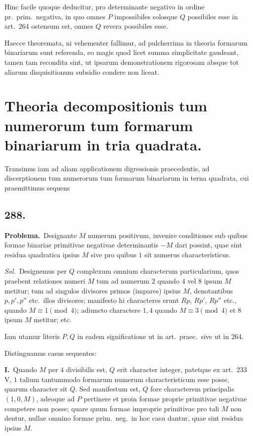 \documentclass[12pt,a4paper]{article}
\theoremstyle{plain}
\theoremstyle{definition}
\theoremstyle{remark}
\begin{document}
Hinc facile quoque deducitur, pro determinante negativo in ordine pr.\ prim.\ negativa, in quo omnes $P$ impossibiles solosque $Q$ possibiles esse in art.\ 264 ostensum est, omnes $Q$ revera possibiles esse.

Haecce theoremata, ni vehementer fallimur, ad pulcherrima in theoria formarum binariarum sunt referenda, eo magis quod licet summa simplicitate gaudeant, tamen tam recondita sint, ut ipsarum demonstrationem rigorosam absque tot aliarum disquisitionum subsidio condere non liceat.

\section*{Theoria decompositionis tum numerorum tum formarum binariarum in tria quadrata.}

Transimus iam ad aliam applicationem digressionis praecedentis, ad discerptionem tum numerorum tum formarum binariarum in terna quadrata, cui praemittimus sequens

\subsection*{288.}

\textbf{Problema.}\ Designante $M$ numerum positivum, invenire conditiones sub quibus formae binariae primitivae negativae determinantis $-M$ dari possint, quae sint residua quadratica ipsius $M$ sive pro quibus $1$ sit numerus characteristicus.

\textit{Sol.}\ Designemus per $Q$ complexum omnium characterum particularium, quos praebent relationes numeri $M$ tum ad numerum $2$ quando $4$ vel $8$ ipsum $M$ metitur; tum ad singulos divisores primos (impares) ipsius $M$, denotantibus $p, p', p''$ etc.\ illos divisores; manifesto hi characteres erunt $Rp$, $Rp'$, $Rp''$ etc., quando $M \equiv 1 \pmod{4}$; adiuncto charactere $1, 4$ quando $M \equiv 3 \pmod{4}$ et $8$ ipsum $M$ metitur; etc.

Iam utamur literis $P, Q$ in eadem significatione ut in art.\ praec.\ sive ut in 264.

Distinguamus casus sequentes:

\textbf{I.}\ Quando $M$ per $4$ divisibilis est, $Q$ erit character integer, patetque ex art.\ 233 V, $1$ talium tantummodo formarum numerum characteristicum esse posse, quarum character sit $Q$. Sed manifestum est, $Q$ fore characterem principalis $(1, 0, M)$, adeoque ad $P$ pertinere et proin formae proprie primitivae negativae competere non posse; quare quum formae improprie primitivae pro tali $M$ non dentur, nullae omnino formae prim.\ neg.\ in hoc casu dantur, quae sint residua ipsius $M$.
\end{document}
